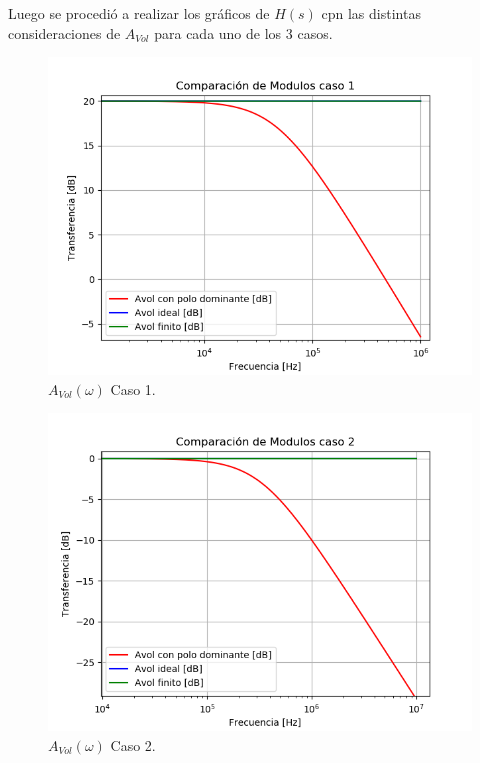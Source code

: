 Luego se procedió a realizar los gráficos de $H(s)$ cpn las distintas consideraciones de $A_{Vol}$ para cada uno de los 3 casos.
\begin{figure}[H]	
	\centering
	\includegraphics[width=\textwidth]{Ejercicio1/Imagenes/HCompC1.png}
	\caption{$A_{Vol}(\omega)$ Caso 1.}
	\label{fig:AvolC1}
\end{figure}
\begin{figure}[H]	
	\centering
	\includegraphics[width=\textwidth]{Ejercicio1/Imagenes/HCompC2.png}
	\caption{$A_{Vol}(\omega)$ Caso 2.}
	\label{fig:AvolC2}
\end{figure}
